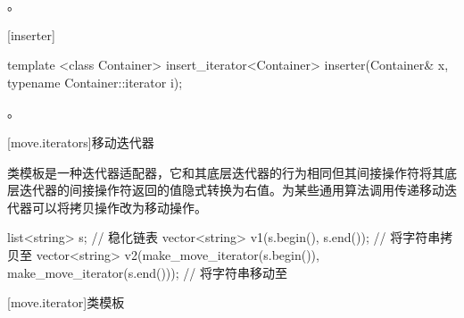 \begin{itemdescr}
\pnum
\returns
{}。
\end{itemdescr}

[inserter]{}

%
\begin{itemdecl}
template <class Container>
  insert_iterator<Container> inserter(Container& x, typename Container::iterator i);
\end{itemdecl}

\begin{itemdescr}
\pnum
\returns
{}。
\end{itemdescr}

[move.iterators]{移动迭代器}

\pnum
类模板是一种迭代器适配器，它和其底层迭代器的行为相同但其间接操作符将其底层迭代器的间接操作符返回的值隐式转换为右值。为某些通用算法调用传递移动迭代器可以将拷贝操作改为移动操作。

\pnum
\enterexample

\begin{codeblock}
list<string> s;
// 稳化链表
vector<string> v1(s.begin(), s.end());          // 将字符串拷贝至
vector<string> v2(make_move_iterator(s.begin()),
                  make_move_iterator(s.end())); // 将字符串移动至
\end{codeblock}

\exitexample

[move.iterator]{类模板}

